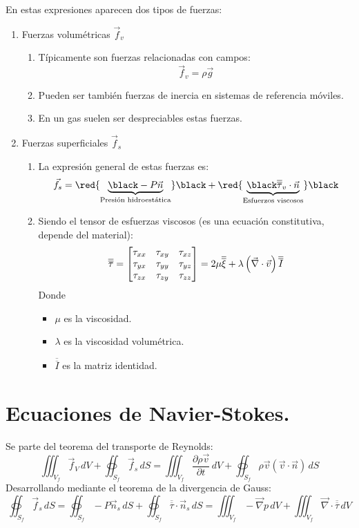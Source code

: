 En estas expresiones aparecen dos tipos de fuerzas:
\begin{enumerate}
	\item Fuerzas volumétricas $\vec{f}_v$
	\begin{enumerate}
		\item Típicamente son fuerzas relacionadas con campos:
		\[\vec{f}_v=\rho \vec{g}\]
		\item Pueden ser también fuerzas de inercia en sistemas de referencia móviles.
		\item En un gas suelen ser despreciables estas fuerzas.
	\end{enumerate}
	\item Fuerzas superficiales $\vec{f}_s$
	
	\begin{enumerate}
		\item La expresión general de estas fuerzas es:
		\[\vec{f}_s=
		\red{\underbrace{\black -P\vec{n}}_{\text{Presión hidroestática}}}\black
		+
		\red{\underbrace{\black \overline{\overline{\tau}}_v\cdot\vec{n}}_{\text{Esfuerzos viscosos}}}\black
		\]
		\item Siendo el tensor de esfuerzas viscosos (es una ecuación constitutiva, depende del material):
		\[
		\overline{\overline{\tau}}=
		\renewcommand{\arraystretch}{1}
		\begin{bmatrix}
			\tau_{xx} & \tau_{xy} & \tau_{xz}\\
			\tau_{yx} & \tau_{yy} & \tau_{yz}\\	
			\tau_{zx} & \tau_{zy} & \tau_{zz}\\
		\end{bmatrix}
		=2\mu \overline{\overline{\xi}} + \lambda \left(\vec{\nabla}\cdot \vec{v}\right)\overline{\overline{I}}
		\]
		Donde \begin{itemize}
			\item $\mu$ es la viscosidad.
			\item $\lambda$ es la viscosidad volumétrica.
			\item $\overline{\overline{I}}$ es la matriz identidad.
		\end{itemize}
	\end{enumerate}
\end{enumerate}
\section{Ecuaciones de Navier-Stokes.}
Se parte del teorema del transporte de Reynolds:
\begin{equation}
\iiint_{V_f}\vec{f}_V\,dV
+
\oiint_{S_f}\vec{f}_s\,dS
=
\iiint_{V_f}\dfrac{\partial \rho\vec{v}}{\partial t}\,dV
+
\oiint_{S_f}\rho\vec{v}\left(\vec{v}\cdot\vec{n}\right)\,dS
\end{equation}
Desarrollando mediante el teorema de la divergencia de Gauss:
\begin{equation}
	\oiint_{S_f}\vec{f}_s\,dS
	=
	\oiint_{S_f}-P\vec{n}_s\,dS
	+
	\oiint_{S_f}\overline{\overline{\tau}}\cdot\vec{n}_s\,dS
	=
	\iiint_{V_f}-\vec{\nabla}p\,dV
	+
	\iiint_{V_f}\vec{\nabla}\cdot\overline{\overline{\tau}}\,dV
\end{equation}

